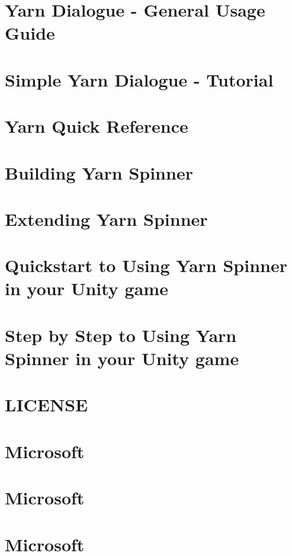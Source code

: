 \documentclass[twoside]{book}
\begin{document}
\chapter{Yarn Dialogue -\/ General Usage Guide}
\label{a00014}
\hypertarget{a00014}{}

\chapter{Simple Yarn Dialogue -\/ Tutorial}
\label{a00016}
\hypertarget{a00016}{}

\chapter{Yarn Quick Reference}
\label{a00018}
\hypertarget{a00018}{}

\chapter{Building Yarn Spinner}
\label{a00020}
\hypertarget{a00020}{}

\chapter{Extending Yarn Spinner}
\label{a00022}
\hypertarget{a00022}{}

\chapter{Quickstart to Using Yarn Spinner in your Unity game}
\label{a00024}
\hypertarget{a00024}{}

\chapter{Step by Step to Using Yarn Spinner in your Unity game}
\label{a00026}
\hypertarget{a00026}{}

\chapter{L\-I\-C\-E\-N\-S\-E}
\label{a00028}
\hypertarget{a00028}{}

\chapter{Microsoft}
\label{a00030}
\hypertarget{a00030}{}

\chapter{Microsoft}
\label{a00032}
\hypertarget{a00032}{}

\chapter{Microsoft}
\label{a00034}
\hypertarget{a00034}{}

\end{document}
